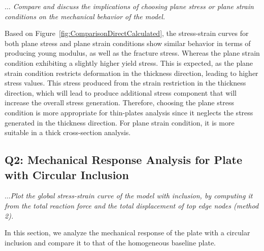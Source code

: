 \documentclass[12pt]{article}
\begin{document}
\textit{$\dots$ Compare and discuss the implications of choosing plane stress or plane strain conditions on
the mechanical behavior of the model.}
\vspace{1em}

\hspace{2em}Based on Figure~\ref{fig:ComparisonDirectCalculated}, the stress-strain curves for both plane stress and plane strain 
conditions show similar behavior in terms of producing young modulus, as well as the fracture stress.
Whereas the plane strain condition exhibiting a slightly higher yield stress.
This is expected, as the plane strain condition restricts deformation in the thickness direction, 
leading to higher stress values. This stress produced from the strain restriction in the thickness direction,
which will lead to produce additional stress component that will increase the overall stress generation. Therefore, choosing the 
plane stress condition is more appropriate for thin-plates analysis since it neglects the stress generated 
in the thickness direction. For plane strain condition, it is more suitable in a thick cross-section analysis. 

\newpage
\subsection*{Q2: Mechanical Response Analysis for Plate with Circular Inclusion}

\textit{$\dots$Plot the global stress-strain curve of the model with inclusion, by computing it from the total
reaction force and the total displacement of top edge nodes (method 2).}
\vspace{1em}

In this section, we analyze the mechanical response of the plate with a circular inclusion and compare it to that of the homogeneous baseline plate.
\end{document}
